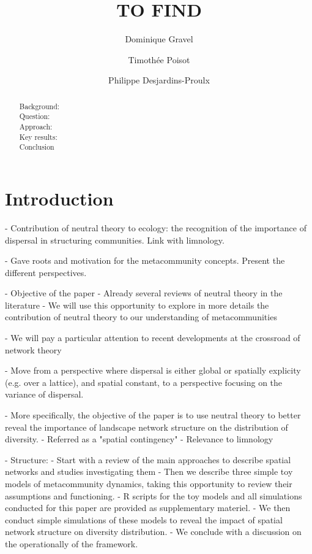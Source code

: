 \documentclass[letterpaper,twocolumn,showkeys]{revtex4-1}
\begin{document}
\title{TO FIND}

\author{Dominique Gravel}
\author{Timothée Poisot}
\author{Philippe Desjardins-Proulx}

\begin{abstract}
Background: \\
Question: \\
Approach: \\
Key results: \\
Conclusion\\

\end{abstract}


\maketitle




\section{Introduction}

- Contribution of neutral theory to ecology: the recognition of
the importance of dispersal in structuring communities. Link with limnology.


- Gave roots and motivation for the metacommunity concepts.
Present the different perspectives.


- Objective of the paper 
	- Already several reviews of neutral theory in the literature
- We will use this opportunity to explore in more details the
contribution of neutral theory to our understanding of
metacommunities

- We will pay a particular attention to recent developments at
the crossroad of network theory

- Move from a perspective where dispersal is either global or
spatially explicity (e.g. over a lattice), and spatial constant,
to a perspective focusing on the variance of dispersal.

- More specifically, the objective of the paper is to use
neutral theory to better reveal the importance of landscape
network structure on the distribution of diversity.
	- Referred as a "spatial contingency" 
	- Relevance to limnology

- Structure:
- Start with a review of the main approaches to describe spatial
networks and studies investigating them
- Then we describe three simple toy models of metacommunity
dynamics, taking this opportunity to review their assumptions
and functioning.
- R scripts for the toy models and all simulations conducted for
this paper are provided as supplementary materiel.
- We then conduct simple simulations of these models to reveal
the impact of spatial network structure on diversity
distribution.
- We conclude with a discussion on the operationally of the
framework.
\end{document}

